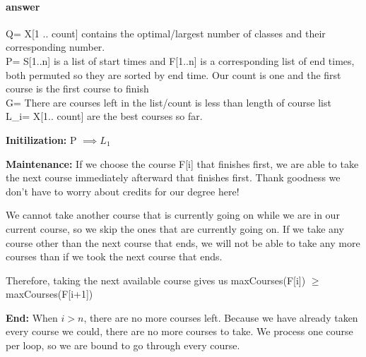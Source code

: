 \documentclass{article}
\begin{document}
\paragraph{answer}

Q= X[1 .. count] contains the optimal/largest number of classes and their corresponding number.\\
P= S[1..n] is a list of start times and F[1..n] is a corresponding list of end times, both permuted
so they are sorted by end time. Our count is one and the first course is the first course to finish\\
G= There are courses left in the list/count is less than length of course list\\
L_{i}= X[1.. count] are the best courses so far.

{\bf Initilization:} P $\implies L_{1}$

{\bf Maintenance: } If we choose the course F[i] that finishes first, we are able to take the next course immediately afterward that finishes first. Thank goodness we don't have to worry about credits for our degree here!

We cannot take another course that is currently going on while we are in our current course, so we skip the ones that are currently going on. If we take any course other than the next course that ends, we will not be able to take any more courses than if we took the next course that ends.

Therefore, taking the next available course gives us maxCourses(F[i]) $\geq$ maxCourses(F[i+1])

{\bf End: } When $i > n$, there are no more courses left. Because we have already taken every course we could, there are no more courses to take. We process one course per loop, so we are bound to go through every course.
\end{document}
